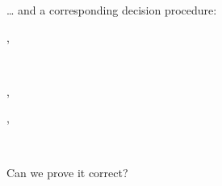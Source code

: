 \documentclass[a4paper]{article}
\begin{document}
… and a corresponding decision procedure:

\begin{alectryon}
  \sep
  \begin{sentence}
    \begin{input}
      ~~~~~\nl
      ~~~~\nl
      ~~~~~\nl
      ~~~~~\nl
      ~~~~~~~~\nl
      ~~\nl
    \end{input}
  \end{sentence}
  \sep
  \begin{txt}
    \nl
    \nl
  \end{txt}
  \sep
  \begin{sentence}
    \begin{input}
      ~~~~
    \end{input}
  \end{sentence}
\end{alectryon}

Can we prove it correct?
\end{document}
